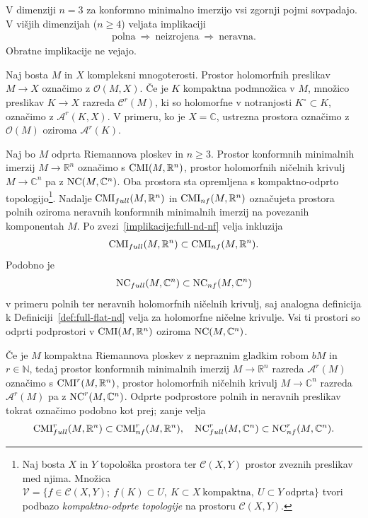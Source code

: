 \documentclass[12pt,a4paper,twoside]{article}
\theoremstyle{definition} %
\theoremstyle{plain} %
\numberwithin{equation}{section}  %
\newcommand{\R}{\mathbb R}
\newcommand{\N}{\mathbb N}
\newcommand{\C}{\mathbb C}
\begin{document}
V dimenziji  $n=3$ za konformno minimalno imerzijo vsi zgornji pojmi sovpadajo. V višjih dimenzijah ($n \geq 4$) veljata implikaciji
\begin{gather} \label{implikacije:full-nd-nf}
\text{polna} \ \Rightarrow \ \text{neizrojena} \ \Rightarrow \ \text{neravna}.
\end{gather}
Obratne implikacije ne vejajo.

Naj bosta $M$ in $X$ kompleksni mnogoterosti. Prostor holomorfnih preslikav $M \to X$ označimo z $\mathcal{O}(M,X)$.
Če je $K$ kompaktna podmnožica v $M$, množico preslikav $K \to X$ razreda $\mathcal{C}^{r}(M)$, ki so holomorfne v notranjosti $K^\circ \subset K$, označimo z $\mathcal{A}^{r}(K,X)$.
V primeru, ko je $X = \C$, ustrezna prostora označimo z $\mathcal{O}(M)$ oziroma $\mathcal{A}^{r}(K)$.

Naj bo $M$ odprta Riemannova ploskev in $n \geq 3$. Prostor konformnih minimalnih imerzij $M \to \R^{n}$ označimo s $\textup{CMI}(M, \R^{n})$, prostor holomorfnih ničelnih krivulj $M \to \C^{n}$ pa z $\textup{NC}(M, \C^{n})$. Oba prostora sta opremljena s kompaktno-odprto topologijo\footnote{Naj bosta $X$ in $Y$ topološka prostora ter $\mathcal{C}(X,Y)$ prostor zveznih preslikav med njima. Množica $\mathcal{V} = \{ f \in \mathcal{C}(X,Y); \ f(K) \subset U, \ K \subset X \ \text{kompaktna}, \ U \subset Y \ \text{odprta} \}$ tvori podbazo \emph{kompaktno-odprte topologije} na prostoru $\mathcal{C}(X,Y)$.}.
Nadalje $\textup{CMI}_{full}(M, \R^{n})$ in $\textup{CMI}_{nf}(M, \R^{n})$ označujeta prostora polnih oziroma neravnih konformnih minimalnih imerzij na povezanih komponentah $M$. Po zvezi~\eqref{implikacije:full-nd-nf} velja inkluzija 
\begin{gather*}
\textup{CMI}_{full}(M, \R^{n}) \subset \textup{CMI}_{nf}(M, \R^{n}).
\end{gather*}
%
Podobno je 
\begin{gather*}
\textup{NC}_{full}(M, \C^{n}) \subset \textup{NC}_{nf}(M, \C^{n})
\end{gather*} 
v primeru polnih ter neravnih holomorfnih ničelnih krivulj, saj analogna definicija k Definiciji~\ref{def:full-flat-nd} velja za holomorfne ničelne krivulje. Vsi ti prostori so odprti podprostori v $\textup{CMI}(M, \R^{n})$ oziroma $\textup{NC}(M, \C^{n})$.

Če je $M$ kompaktna Riemannova ploskev z nepraznim gladkim robom $bM$ in $r \in \N$, tedaj prostor konformnih minimalnih imerzij $M \to \R^{n}$ razreda $\mathcal{A}^{r}(M)$ označimo s $\textup{CMI}^{r}(M, \R^{n})$, prostor holomorfnih ničelnih krivulj $M \to \C^{n}$ razreda $\mathcal{A}^{r}(M)$ pa z $\textup{NC}^{r}(M, \C^{n})$.
Odprte podprostore polnih in neravnih preslikav tokrat označimo podobno kot prej; zanje velja
\begin{gather*}
\textup{CMI}_{full}^{r}(M, \R^{n}) \subset \textup{CMI}_{nf}^{r}(M, \R^{n}), \quad \textup{NC}_{full}^{r}(M, \C^{n}) \subset \textup{NC}_{nf}^{r}(M, \C^{n}).
\end{gather*}
\end{document}
